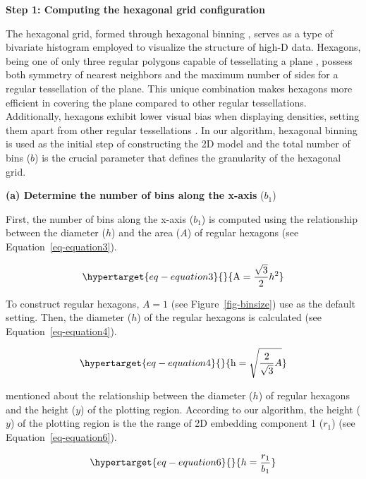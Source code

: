 \documentclass[
  12pt]{article}
\begin{document}
\textbf{Step 1: Computing the hexagonal grid configuration}

The hexagonal grid, formed through hexagonal binning
\citep[\citet{article66}]{Carr1987}, serves as a type of bivariate
histogram employed to visualize the structure of high-D data. Hexagons,
being one of only three regular polygons capable of tessellating a plane
\citep{Carr2013}, possess both symmetry of nearest neighbors and the
maximum number of sides for a regular tessellation of the plane. This
unique combination makes hexagons more efficient in covering the plane
compared to other regular tessellations. Additionally, hexagons exhibit
lower visual bias when displaying densities, setting them apart from
other regular tessellations \citep{Dan2023}. In our algorithm, hexagonal
binning is used as the initial step of constructing the 2D model and the
total number of bins (\(b\)) is the crucial parameter that defines the
granularity of the hexagonal grid.

\textbf{(a) Determine the number of bins along the x-axis} (\(b_1\))

First, the number of bins along the x-axis (\(b_1\)) is computed using
the relationship between the diameter (\(h\)) and the area (\(A\)) of
regular hexagons (see Equation~\ref{eq-equation3}).

\begin{equation}\protect\hypertarget{eq-equation3}{}{
 \text{A} = \frac{\sqrt{3}}{2}h^2
}\label{eq-equation3}\end{equation}

To construct regular hexagons, \(A = 1\) (see Figure~\ref{fig-binsize})
use as the default setting. Then, the diameter (\(h\)) of the regular
hexagons is calculated (see Equation~\ref{eq-equation4}).

\begin{equation}\protect\hypertarget{eq-equation4}{}{
  \text{h} = \sqrt{\frac{2}{\sqrt{3}}A}
}\label{eq-equation4}\end{equation}

\citet{Carr2013} mentioned about the relationship between the diameter
(\(h\)) of regular hexagons and the height (\(y\)) of the plotting
region. According to our algorithm, the height (\(y\)) of the plotting
region is the the range of 2D embedding component 1 (\(r_1\)) (see
Equation~\ref{eq-equation6}).

\begin{equation}\protect\hypertarget{eq-equation6}{}{
h = \frac{r_1}{b_1}
}\label{eq-equation6}\end{equation}
\end{document}
